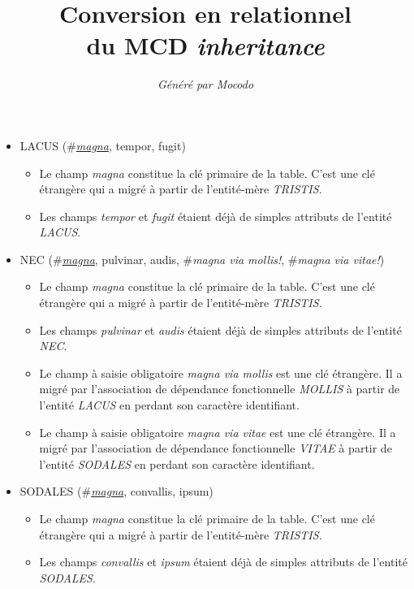 \documentclass[a4paper]{article}
\title{Conversion en relationnel\\du MCD \emph{inheritance}}
\author{\emph{Généré par Mocodo}}
\newcommand{\relat}[1]{\textsc{#1}}
\newcommand{\attr}[1]{#1}
\newcommand{\prim}[1]{\uline{#1}}
\newcommand{\foreign}[1]{\#\textsl{#1}}
\begin{document}
\maketitle

\begin{itemize}
  \item \relat{LACUS} (\foreign{\prim{magna}}, \attr{tempor}, \attr{fugit})
  \begin{itemize}
    \item Le champ \emph{magna} constitue la clé primaire de la table. C'est une clé étrangère qui a migré à partir de l'entité-mère \emph{TRISTIS}.
    \item Les champs \emph{tempor} et \emph{fugit} étaient déjà de simples attributs de l'entité \emph{LACUS}.
  \end{itemize}

  \item \relat{NEC} (\foreign{\prim{magna}}, \attr{pulvinar}, \attr{audis}, \foreign{magna via mollis!}, \foreign{magna via vitae!})
  \begin{itemize}
    \item Le champ \emph{magna} constitue la clé primaire de la table. C'est une clé étrangère qui a migré à partir de l'entité-mère \emph{TRISTIS}.
    \item Les champs \emph{pulvinar} et \emph{audis} étaient déjà de simples attributs de l'entité \emph{NEC}.
    \item Le champ à saisie obligatoire \emph{magna via mollis} est une clé étrangère. Il a migré par l'association de dépendance fonctionnelle \emph{MOLLIS} à partir de l'entité \emph{LACUS} en perdant son caractère identifiant.
    \item Le champ à saisie obligatoire \emph{magna via vitae} est une clé étrangère. Il a migré par l'association de dépendance fonctionnelle \emph{VITAE} à partir de l'entité \emph{SODALES} en perdant son caractère identifiant.
  \end{itemize}

  \item \relat{SODALES} (\foreign{\prim{magna}}, \attr{convallis}, \attr{ipsum})
  \begin{itemize}
    \item Le champ \emph{magna} constitue la clé primaire de la table. C'est une clé étrangère qui a migré à partir de l'entité-mère \emph{TRISTIS}.
    \item Les champs \emph{convallis} et \emph{ipsum} étaient déjà de simples attributs de l'entité \emph{SODALES}.
  \end{itemize}


\end{itemize}
\end{document}

